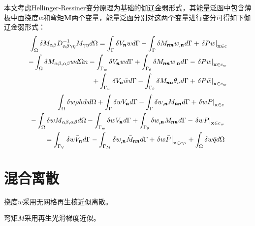 本文考虑Hellinger-Ressiner变分原理为基础的伽辽金弱形式，其能量泛函中包含薄板中面挠度$w$和弯矩$\boldsymbol M$两个变量，能量泛函分别对这两个变量进行变分可得如下伽辽金弱形式：
\begin{equation}
\begin{split}
    \int_\Omega  {\delta {M_{\alpha \beta }}D_{\alpha \beta \gamma \eta }^{ - 1}{M_{\gamma \eta }}d\Omega }  = \int_\Gamma  {\delta {V_{\pmb{n}}}wd\Gamma }  - \int_\Gamma  {\delta {M_{{\pmb{nn}}}}{w_{{\pmb{,n}}}}d\Gamma }  + {\left. {\delta Pw} \right|_{{\bf{x}} \in c}}\\
     - \int_\Omega  {\delta {M_{\alpha \beta ,\alpha \beta }}wd\Omega } n - \int_{{\Gamma _w}} {\delta {V_{\pmb{n}}}wd\Gamma }  + \int_{{\Gamma _\theta }} {\delta {M_{{\pmb{nn}}}}{w_{,{\pmb{n}}}}d\Gamma }  - {\left. {\delta Pw} \right|_{{\bf{x}} \in {c_w}}}\\
     + \int_{{\Gamma _w}} {\delta {V_{\pmb{n}}}\bar wd\Gamma }  - \int_{{\Gamma _\theta }} {\delta {M_{{\pmb{nn}}}}{{\bar \theta }_n}d\Gamma }  + {\left. {\delta P\bar w} \right|_{{\bf{x}} \in {c_w}}}
\end{split}
\end{equation}
\begin{equation}
\begin{split}
    \int_\Omega  \delta  w\rho h\ddot wd\Omega  + \int_\Gamma  {\delta w{V_{\pmb{n}}}d\Gamma }  - \int_\Gamma  {\delta {w_{,{\pmb{n}}}}{M_{{\pmb{nn}}}}d\Gamma }  + {\left. {\delta wP} \right|_{{\bf{x}} \in {c_{}}}}\\
     - \int_\Omega  {\delta w{M_{\alpha \beta ,\alpha \beta }}d\Omega }  - \int_{{\Gamma _w}} {\delta w{V_{\pmb{n}}}d\Gamma }  + \int_{{\Gamma _\theta }} {\delta {w_{{\pmb{,n}}}}{M_{{\pmb{nn}}}}d\Gamma }  - {\left. {\delta wP} \right|_{{\bf{x}} \in {c_w}}}\\
     = \int_{{\Gamma _V}} {\delta w{{\bar V}_{\pmb{n}}}d\Gamma }  - \int_{{\Gamma _M}} {\delta {w_{{\pmb{,n}}}}{{\bar M}_{{\pmb{nn}}}}d\Gamma }  + {\left. {\delta w\bar P} \right|_{{\bf{x}} \in {c_P}}} + \int_\Omega  {\delta w\bar qd\Omega } 
\end{split}
\end{equation}
\section{混合离散}
挠度$w$采用无网格再生核近似离散。\par
弯矩$M$采用再生光滑梯度近似。
